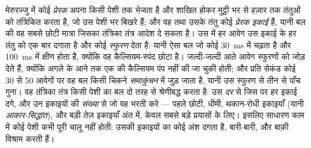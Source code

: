 \begin{definition}[प्रेरक इकाई]\label{def:b2:muscle-movement:motorunit}
मेरुरज्जु में कोई \emph{प्रेरक } अपना  किसी
पेशी तक भेजता है और शाखित होकर मुट्ठी भर से हज़ार तक
तंतुओं को तंत्रिकित करता है, जो उस पेशी भर बिखरे हैं; और वह  तथा उसके तंतु
कोई \emph{प्रेरक इकाई} हैं, यानी बल की वह सबसे छोटी मात्रा जिसका तंत्रिका
तंत्र आदेश दे सकता है। उस  में हर आवेग उस इकाई के हर तंतु को
एक बार दगाता है और कोई \emph{स्फुरण} देता है: यानी ऐसा बल जो
कोई \qty{30}{ms} में चढ़ता है और \qty{100}{ms} में क्षीण होता है, क्योंकि वह
कैल्सियम-स्पंद छोटा है। जल्दी-जल्दी आते आवेग स्फुरणों को
जोड़ देते हैं, क्योंकि अगले के आने तक एक की कैल्सियम पंप नहीं की जा चुकी होती;
और प्रति सेकंड कोई 30 से 50 आवेगों पर वह बल किसी चिकने \emph{समाकुंचन}
में जुड़ जाता है, यानी उस स्फुरण से तीन से पाँच गुना। वह
तंत्रिका तंत्र किसी पेशी का बल दो तरह से श्रेणीबद्ध करता है: उस \emph{दर}
से जिस पर हर इकाई दगे, और उन इकाइयों की \emph{संख्या} से जो वह
भरती करे --- पहले छोटी, धीमी, थकान-रोधी इकाइयाँ
(यानी \emph{आकार-सिद्धांत}), और बड़ी तेज़ इकाइयाँ अंत में, केवल
सबसे बड़े प्रयासों के लिए। इसलिए साधारण काम में कोई पेशी कभी पूरी
चालू नहीं होती: उसकी इकाइयों का कोई अंश दगता है, बारी-बारी, और बाक़ी विश्राम करती हैं।
\end{definition}

